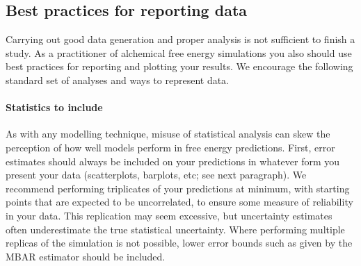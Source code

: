 \documentclass[9pt,bestpractices]{livecoms}
\begin{document}

\subsection{Best practices for reporting data }
\label{sec:plot_data}
Carrying out good data generation and proper analysis is not sufficient to finish a study. As a practitioner of alchemical free energy simulations you also  should use best practices for reporting and plotting your results. We  encourage the following standard set of analyses and ways to represent data. 
\paragraph{Statistics to include}
As with any modelling technique, misuse of statistical analysis can skew the perception of how well models perform in free energy predictions. First, error estimates should always be included on your predictions in whatever form you present your data (scatterplots, barplots, etc; see next paragraph). We recommend performing triplicates of your predictions at minimum, with starting points that are expected to be uncorrelated, to ensure some measure of reliability in your data. This replication may seem excessive, but  uncertainty estimates often underestimate the true statistical uncertainty. Where performing multiple replicas of the simulation is not possible, lower error bounds such as given by the MBAR estimator should be included. 
\end{document}
